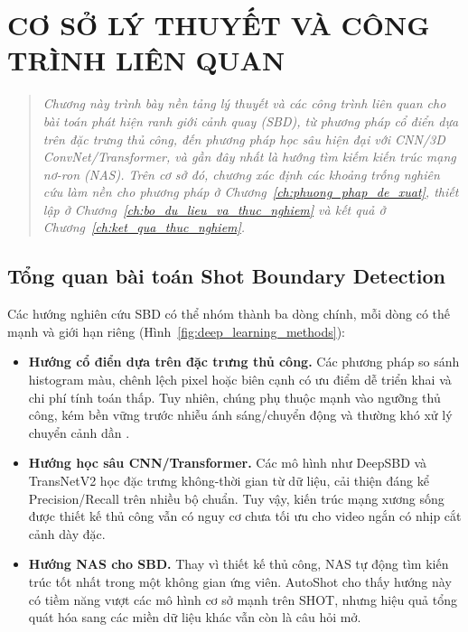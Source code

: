 \chapter{CƠ SỞ LÝ THUYẾT VÀ CÔNG TRÌNH LIÊN QUAN}
\label{cong_trinh_lien_quan}
\vspace{-1.5cm}
\begin{quotation}
\noindent
\small\textit{
Chương này trình bày nền tảng lý thuyết và các công trình liên quan cho bài toán phát hiện ranh giới cảnh quay (SBD), từ phương pháp cổ điển dựa trên đặc trưng thủ công, đến phương pháp học sâu hiện đại với CNN/3D ConvNet/Transformer, và gần đây nhất là hướng tìm kiếm kiến trúc mạng nơ-ron (NAS). Trên cơ sở đó, chương xác định các khoảng trống nghiên cứu làm nền cho phương pháp ở Chương~\ref{ch:phuong_phap_de_xuat}, thiết lập ở Chương~\ref{ch:bo_du_lieu_va_thuc_nghiem} và kết quả ở Chương~\ref{ch:ket_qua_thuc_nghiem}.
}
\end{quotation}
\vspace{1em}

\section{Tổng quan bài toán Shot Boundary Detection}
\label{sec:sbd_overview}
Các hướng nghiên cứu SBD có thể nhóm thành ba dòng chính, mỗi dòng có thế mạnh và giới hạn riêng (Hình~\ref{fig:deep_learning_methods}):
\begin{itemize}
    \item \textbf{Hướng cổ điển dựa trên đặc trưng thủ công.} Các phương pháp so sánh histogram màu, chênh lệch pixel hoặc biên cạnh có ưu điểm dễ triển khai và chi phí tính toán thấp. Tuy nhiên, chúng phụ thuộc mạnh vào ngưỡng thủ công, kém bền vững trước nhiễu ánh sáng/chuyển động và thường khó xử lý chuyển cảnh dần \cite{Abdulhussain2018_SBD_MethodsChallenges}.
    \item \textbf{Hướng học sâu CNN/Transformer.} Các mô hình như DeepSBD \cite{hassanien2017largescale} và TransNetV2 \cite{soucek2020transnetv2} học đặc trưng không-thời gian từ dữ liệu, cải thiện đáng kể Precision/Recall trên nhiều bộ chuẩn. Tuy vậy, kiến trúc mạng xương sống được thiết kế thủ công vẫn có nguy cơ chưa tối ưu cho video ngắn có nhịp cắt cảnh dày đặc.
    \item \textbf{Hướng NAS cho SBD.} Thay vì thiết kế thủ công, NAS \cite{elsken2018_nas_survey,ren2020_nas_survey,white2023_nas1000} tự động tìm kiến trúc tốt nhất trong một không gian ứng viên. AutoShot \cite{zhu2023autoshot} cho thấy hướng này có tiềm năng vượt các mô hình cơ sở mạnh trên SHOT, nhưng hiệu quả tổng quát hóa sang các miền dữ liệu khác vẫn còn là câu hỏi mở.
\end{itemize}

